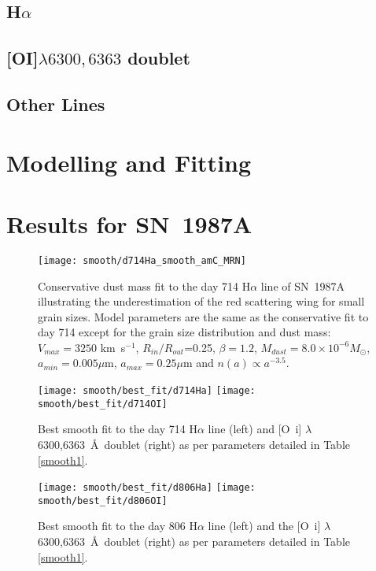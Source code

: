 	\subsection{H$\alpha$}
	\subsection{[OI]$\lambda 6300,6363$ doublet}
	\subsection{Other Lines}
\section{Modelling and Fitting}
\section{Results for SN~1987A}
\label{results}

\begin{figure}
\begin{center}
\texttt{[image: smooth/d714Ha\_smooth\_amC\_MRN]}
\caption{Conservative dust mass fit to the day 714 H$\alpha$ line of SN~1987A illustrating the 
underestimation of the red scattering wing for small grain sizes.  Model 
parameters are the same as the conservative fit to day 714 except for the 
grain size distribution and dust mass:  $V_{max}=3250$ km~s$^{-1}$, 
$R_{in}/R_{out}$=0.25, $\beta = 1.2$, $M_{dust}=8.0 \times 10^{-6} 
M_{\odot}$, $a_{min}=0.005 \mu$m, $a_{max}=0.25 \mu$m and $n(a) \propto 
a^{-3.5}$.}
\label{MRN}
\end{center}
\end{figure}

\begin{figure*}
\begin{center}
\texttt{[image: smooth/best\_fit/d714Ha]}
\texttt{[image: smooth/best\_fit/d714OI]}
\caption{Best smooth fit to the day 714 H$\alpha$ line (left) and 
[O~{\sc i}] $\lambda$6300,6363~\AA\ doublet (right) as per parameters 
detailed in Table \ref{smooth1}.}
\label{d714bf}
\end{center}
\end{figure*}
\begin{figure*}
\begin{center}
\texttt{[image: smooth/best\_fit/d806Ha]}
\texttt{[image: smooth/best\_fit/d806OI]}
\caption{Best smooth fit to the day 806 H$\alpha$ line (left) and the 
[O~{\sc i}] $\lambda$6300,6363~\AA\ doublet (right) as per parameters 
detailed in Table \ref{smooth1}.}
\label{d806bf}
\end{center}
\end{figure*}


